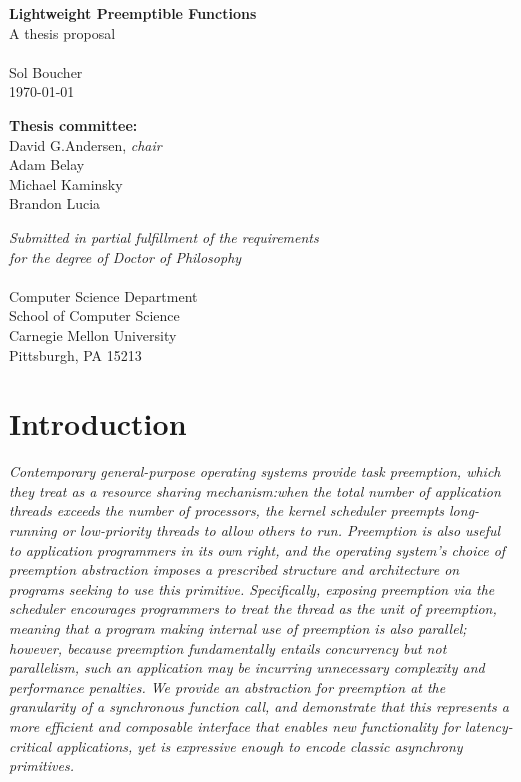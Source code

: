 \documentclass[12pt,letterpaper,openright]{report}
\begin{document}
\begin{titlepage}
\begin{center}
	\vspace*{\fill}

	\textbf{\Large Lightweight Preemptible Functions} \\
	A thesis proposal \\
	\hfill \\
	{\large Sol Boucher} \\
	\today \\

	\vspace{1in}

	\textbf{Thesis committee:} \\
	David G.\@ Andersen, \textit{chair} \\
	Adam Belay \\
	Michael Kaminsky \\
	Brandon Lucia \\

	\vspace{\fill}

	\textit{Submitted in partial fulfillment of the requirements \\
	for the degree of Doctor of Philosophy} \\
	\hfill \\
	Computer Science Department \\
	School of Computer Science \\
	Carnegie Mellon University \\
	Pittsburgh, PA 15213 \\
\end{center}
\end{titlepage}

\tableofcontents
\newpage
{}

\chapter{Introduction}

\textit{Contemporary general-purpose operating systems provide task preemption, which
they treat as a resource sharing mechanism:\@ when the total number of application
threads exceeds the number of processors, the kernel scheduler preempts long-running
or low-priority threads to allow others to run.  Preemption is also useful to
application programmers in its own right, and the operating system's choice of
preemption abstraction imposes a prescribed structure and architecture on programs
seeking to use this primitive.  Specifically, exposing preemption via the scheduler
encourages programmers to treat the thread as the unit of preemption, meaning that
a program making internal use of preemption is also parallel; however, because
preemption fundamentally entails concurrency but not parallelism, such an application
may be incurring unnecessary complexity and performance penalties.  We provide an
abstraction for preemption at the granularity of a synchronous function call, and
demonstrate that this represents a more efficient and composable interface that
enables new functionality for latency-critical applications, yet is expressive enough
to encode classic asynchrony primitives.
}
\end{document}
